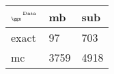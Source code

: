 \begin{tabular}{lll}
    \toprule
    $_{\text{\tiny{\ggn}}}$$^{\text{\tiny{Data}}}$ & mb & sub \\
    \midrule
    exact & 97
              & 703 \\
    mc   & 3759
              & 4918 \\
    \bottomrule
\end{tabular}